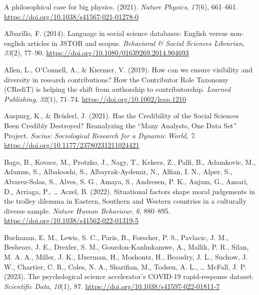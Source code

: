 \documentclass[
  man,mask,floatsintext]{apa7}
\newlength{\cslhangindent}
\newlength{\cslentryspacingunit} %
\newenvironment{CSLReferences}[2] %
 {%
  \setlength{\parindent}{0pt}
  \ifodd #1
  \let\oldpar\par
  \def\par{\hangindent=\cslhangindent\oldpar}
  \fi
  \setlength{\parskip}{#2\cslentryspacingunit}
 }%
 {}
\begin{document}
\begingroup
\setlength{\parindent}{-0.5in}

\hypertarget{refs}{}
\begin{CSLReferences}{1}{0}
\leavevmode{}%
A philosophical case for big physics. (2021). \emph{Nature Physics}, \emph{17}(6), 661--661. \url{https://doi.org/10.1038/s41567-021-01278-0}

\leavevmode{}%
Albarillo, F. (2014). Language in social science databases: English versus non-english articles in JSTOR and scopus. \emph{Behavioral \& Social Sciences Librarian}, \emph{33}(2), 77--90. \url{https://doi.org/10.1080/01639269.2014.904693}

\leavevmode{}%
Allen, L., O'Connell, A., \& Kiermer, V. (2019). How can we ensure visibility and diversity in research contributions? How the Contributor Role Taxonomy (CRediT) is helping the shift from authorship to contributorship. \emph{Learned Publishing}, \emph{32}(1), 71--74. \url{https://doi.org/10.1002/leap.1210}

\leavevmode{}%
Auspurg, K., \& Brüderl, J. (2021). Has the Credibility of the Social Sciences Been Credibly Destroyed? Reanalyzing the {``}Many Analysts, One Data Set{''} Project. \emph{Socius: Sociological Research for a Dynamic World}, \emph{7}. \url{https://doi.org/10.1177/23780231211024421}

\leavevmode{}%
Bago, B., Kovacs, M., Protzko, J., Nagy, T., Kekecs, Z., Palfi, B., Adamkovic, M., Adamus, S., Albalooshi, S., Albayrak-Aydemir, N., Alfian, I. N., Alper, S., Alvarez-Solas, S., Alves, S. G., Amaya, S., Andresen, P. K., Anjum, G., Ansari, D., Arriaga, P., \ldots{} Aczel, B. (2022). Situational factors shape moral judgements in the trolley dilemma in Eastern, Southern and Western countries in a culturally diverse sample. \emph{Nature Human Behaviour}, \emph{6}, 880--895. \url{https://doi.org/10.1038/s41562-022-01319-5}

\leavevmode{}%
Buchanan, E. M., Lewis, S. C., Paris, B., Forscher, P. S., Pavlacic, J. M., Beshears, J. E., Drexler, S. M., Gourdon-Kanhukamwe, A., Mallik, P. R., Silan, M. A. A., Miller, J. K., IJzerman, H., Moshontz, H., Beaudry, J. L., Suchow, J. W., Chartier, C. R., Coles, N. A., Sharifian, M., Todsen, A. L., \ldots{} McFall, J. P. (2023). The psychological science accelerator{'}s COVID-19 rapid-response dataset. \emph{Scientific Data}, \emph{10}(1), 87. \url{https://doi.org/10.1038/s41597-022-01811-7}


\end{CSLReferences}
\end{document}
